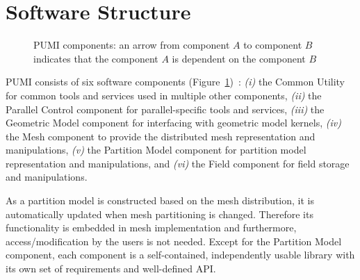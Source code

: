 \section{Software Structure}
\begin{figure}
\begin{center}
\begin{scriptsize}

\end{scriptsize}
\end{center}
\caption{PUMI components: an arrow from component $A$ to component $B$ indicates 
that the component $A$ is dependent on the component $B$}
\label{fig:pumi-comp}
\end{figure}

PUMI consists of six software components (Figure~\ref{fig:pumi-comp})~\cite{pumi12,pumiweb}: 
\emph{(i)} the Common Utility for common tools and services used in multiple other 
components, \emph{(ii)} the Parallel Control component for parallel-specific tools 
and services, \emph{(iii)} the Geometric Model component for interfacing with geometric
 model kernels, \emph{(iv)} the Mesh component to provide the distributed mesh 
representation and manipulations, \emph{(v)} the Partition Model component for 
partition model representation and manipulations, and 
\emph{(vi)} the Field component for field storage and manipulations.

As a partition model is constructed based on the mesh distribution, it is
 automatically updated when mesh partitioning is changed. Therefore its functionality is 
embedded in mesh implementation and furthermore, access/modification 
by the users is not needed. 
Except for the Partition Model component, each component is a self-contained, 
independently usable library with its own set of requirements and 
well-defined API. 

